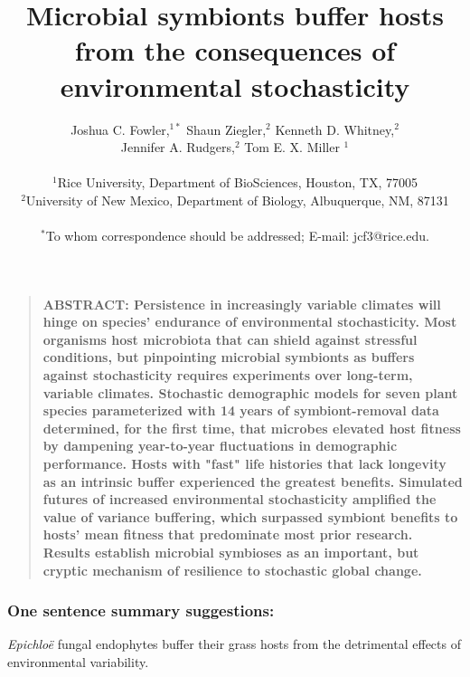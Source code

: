 \documentclass[12pt]{article}
\title{Microbial symbionts buffer hosts from the consequences of environmental stochasticity}
\author
{Joshua C. Fowler,$^{1\ast}$ Shaun Ziegler,$^{2}$ Kenneth D. Whitney,$^{2}$\\
	 Jennifer A. Rudgers,$^{2}$ Tom E. X. Miller $^{1}$\\
\\
\normalsize{$^{1}$Rice University, Department of BioSciences, Houston, TX, 77005}\\
\normalsize{$^{2}$University of New Mexico, Department of Biology, Albuquerque, NM, 87131}\\
\\
\normalsize{$^\ast$To whom correspondence should be addressed; E-mail:  jcf3@rice.edu.}
}
\date{}
\newenvironment{sciabstract}{%
\begin{quote} \bf}
{\end{quote}}
\begin{document}
 


\baselineskip24pt


\maketitle 



\begin{sciabstract}
	ABSTRACT: 
Persistence in increasingly variable climates will hinge on species' endurance of environmental stochasticity.
Most organisms host microbiota that can shield against stressful conditions, but pinpointing microbial symbionts as buffers against stochasticity requires experiments over long-term, variable climates. 
Stochastic demographic models for seven plant species parameterized with 14 years of symbiont-removal data determined, for the first time, that microbes elevated host fitness by dampening year-to-year fluctuations in demographic performance. 
Hosts with "fast" life histories that lack longevity as an intrinsic buffer experienced the greatest benefits. 
Simulated futures of increased environmental stochasticity amplified the value of variance buffering, which surpassed symbiont benefits to hosts' mean fitness that predominate most prior research.
Results establish microbial symbioses as an important, but cryptic mechanism of resilience to stochastic global change.

\end{sciabstract}


\subsubsection*{One sentence summary suggestions:}
\emph{Epichloë} fungal endophytes buffer their grass hosts from the detrimental effects of environmental variability.

\end{document}
